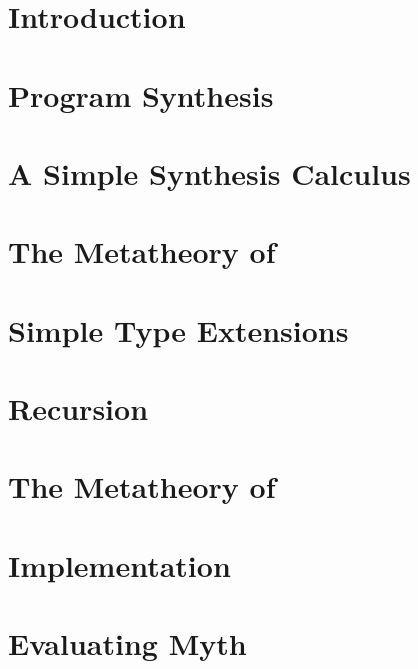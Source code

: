 \chapter{Introduction}
\label{ch:introduction}


\chapter{Program Synthesis}
\label{ch:program-synthesis}


\chapter{A Simple Synthesis Calculus}
\label{ch:a-simple-synthesis-calculus}


\chapter{The Metatheory of \texorpdfstring{\lsyn{}}{λsyn}}
\label{ch:metatheory-of-lsyn}


\chapter{Simple Type Extensions}
\label{ch:simple-type-extensions}


\chapter{Recursion}
\label{ch:recursion}


\chapter{The Metatheory of \texorpdfstring{\mlsyn{}}{MLsyn}}
\label{ch:metatheory-of-mlsyn}


\chapter{Implementation}
\label{ch:implementation}


\chapter{Evaluating Myth}
\label{ch:evaluating-myth}


